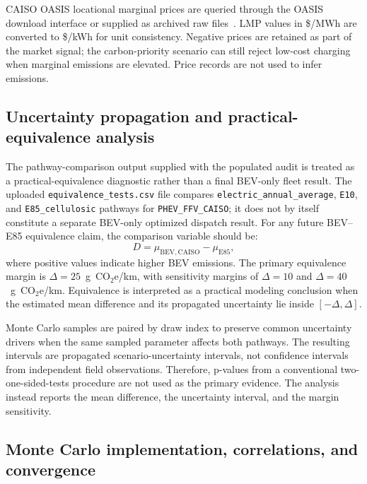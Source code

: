 \documentclass[cleantechnol,article,submit,pdftex,moreauthors]{Definitions/mdpi}
\newcommand{\gcoeqkm}{g~CO$_2$e/km}
\begin{document}
CAISO OASIS locational marginal prices are queried through the OASIS download interface or supplied as archived raw files~\cite{CAISOOASISAPI,CAISOOASISFAQ}. LMP values in \$/MWh are converted to \$/kWh for unit consistency. Negative prices are retained as part of the market signal; the carbon-priority scenario can still reject low-cost charging when marginal emissions are elevated. Price records are not used to infer emissions.


\subsection{Uncertainty propagation and practical-equivalence analysis}
\label{subsec:uncertainty_equivalence}

The pathway-comparison output supplied with the populated audit is treated as a practical-equivalence diagnostic rather than a final BEV-only fleet result. The uploaded \texttt{equivalence\_tests.csv} file compares \texttt{electric\_annual\_average}, \texttt{E10}, and \texttt{E85\_cellulosic} pathways for \texttt{PHEV\_FFV\_CAISO}; it does not by itself constitute a separate BEV-only optimized dispatch result. For any future BEV--E85 equivalence claim, the comparison variable should be:
\begin{equation}
	D=\mu_{\mathrm{BEV,CAISO}}-\mu_{\mathrm{E85}},
	\label{eq:difference}
\end{equation}
where positive values indicate higher BEV emissions. The primary equivalence margin is $\Delta=25$~\gcoeqkm{}, with sensitivity margins of $\Delta=10$ and $\Delta=40$~\gcoeqkm{}. Equivalence is interpreted as a practical modeling conclusion when the estimated mean difference and its propagated uncertainty lie inside $[-\Delta,\Delta]$.

Monte Carlo samples are paired by draw index to preserve common uncertainty drivers when the same sampled parameter affects both pathways. The resulting intervals are propagated scenario-uncertainty intervals, not confidence intervals from independent field observations. Therefore, p-values from a conventional two-one-sided-tests procedure are not used as the primary evidence. The analysis instead reports the mean difference, the uncertainty interval, and the margin sensitivity.


\subsection{Monte Carlo implementation, correlations, and convergence}
\label{subsec:mc_implementation}
\end{document}
